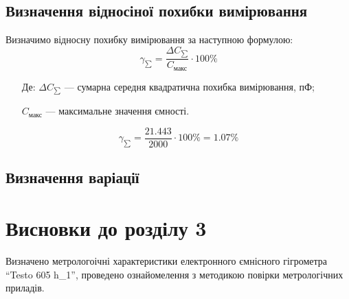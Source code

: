 \subsection{Визначення відносіної похибки вимірювання}
Визначимо відносну похибку вимірювання за наступною формулою:
\begin{equation}
    \gamma_{\sum} = \frac{\Delta C_{\sum}}{C_{\text{макс}}} \cdot 100\%
\end{equation}
\begin{itemize}
\item [Де:] $\Delta C_{\sum}$ --- сумарна середня квадратична похибка вимірювання, пФ;
\item []$C_{\text{макс}}$ ---  максимальне значення ємності.
\end{itemize}
\begin{equation}
    \gamma_{\sum} = \frac{21.443}{2000} \cdot 100\%= 1.07\%
\end{equation}

\subsection{Визначення варіації}

\section*{Висновки до розділу 3}

Визначено метрологоічні характеристики електронного ємнісного гігрометра ``Testo 605 h_1'', проведено
ознайомелення з методикою повірки метрологічних приладів.
